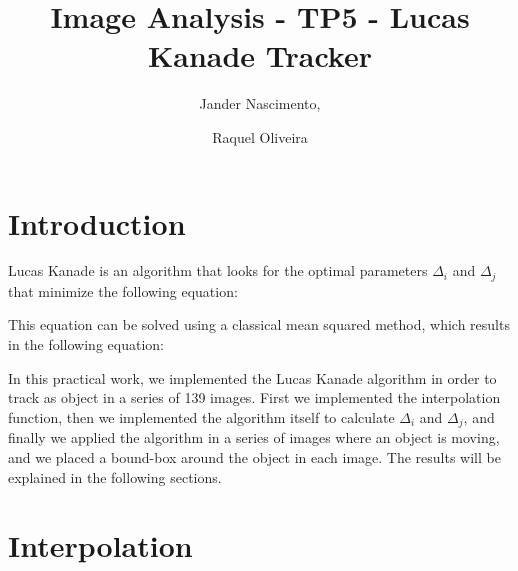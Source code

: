 \documentclass{article}
\begin{document}
\title{Image Analysis - TP5 - Lucas Kanade Tracker}

\author{Jander Nascimento, 
\and Raquel Oliveira}

\maketitle

\section{Introduction}

	Lucas Kanade is an algorithm that looks for the optimal parameters $\Delta_i$ and $\Delta_j$ that minimize the following equation:

	\begin{figure}[H]
		  \centering
		  \caption{}
		  \label{fig:formula1}
	\end{figure}

	This equation can be solved using a classical mean squared method, which results in the following equation:

	\begin{figure}[H]
		  \centering
		  \caption{}
		  \label{fig:formula2}
	\end{figure}	

	In this practical work, we implemented the Lucas Kanade algorithm in order to track as object in a series of 139 images. First we implemented the interpolation function, then we implemented the algorithm itself to calculate $\Delta_i$ and $\Delta_j$, and finally we applied the algorithm in a series of images where an object is moving, and we placed a bound-box around the object in each image. The results will be explained in the following sections.


\section{Interpolation}
\end{document}
